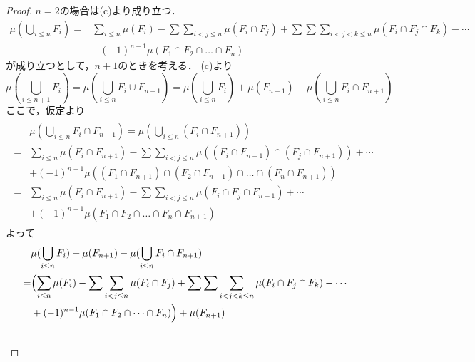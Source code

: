 \documentclass{jsarticle}
\begin{document}
\begin{description}
        \begin{proof}
            $n=2$の場合は(c)より成り立つ．
            \begin{equation}
                \begin{split}
                    \mu(\bigcup_{i\leq n}F_i) = &\sum_{i\leq n}\mu(F_i) -  \sum\sum_{i<j\leq n}\mu(F_i\cap F_j) + \sum\sum\sum_{i<j<k\leq n}\mu(F_i\cap F_j\cap F_k) - \cdots
                    \\ &+ (-1)^{n-1}\mu(F_1\cap F_2\cap\dots\cap F_n) \nonumber
                \end{split}
            \end{equation}
            が成り立つとして，$n+1$のときを考える．
            (c)より
            \begin{equation}
                \mu(\bigcup_{i\leq n+1}F_i)=\mu(\bigcup_{i\leq n}F_i\cup F_{n+1})=\mu(\bigcup_{i\leq n}F_i)+\mu(F_{n+1})-\mu(\bigcup_{i\leq n}F_i\cap F_{n+1}) \nonumber
            \end{equation}
            ここで，仮定より
            \begin{align}
                \begin{split}
                    &\mu(\bigcup_{i\leq n}F_i\cap F_{n+1})=\mu(\bigcup_{i\leq n}(F_i\cap F_{n+1})) \\ \nonumber
                    = &\sum_{i\leq n}\mu(F_i\cap F_{n+1}) -  \sum\sum_{i<j\leq n}\mu((F_i\cap F_{n+1})\cap (F_j\cap F_{n+1})) + \cdots
                    \\ &+ (-1)^{n-1}\mu((F_1\cap F_{n+1})\cap (F_2\cap F_{n+1})\cap\dots\cap (F_n\cap F_{n+1})) \\ \nonumber
                    = &\sum_{i\leq n}\mu(F_i\cap F_{n+1}) -  \sum\sum_{i<j\leq n}\mu(F_i\cap F_j\cap F_{n+1}) + \cdots \\ &+ (-1)^{n-1}\mu(F_1\cap F_2\cap\dots\cap F_n\cap F_{n+1}) \nonumber
                \end{split}
            \end{align}
            よって
            \begin{align}
                \begin{split}
                    &\mu(\bigcup_{i\leq n}F_i)+\mu(F_{n+1})-\mu(\bigcup_{i\leq n}F_i\cap F_{n+1}) \\ \nonumber
                    = & \Bigl( \sum_{i\leq n}\mu(F_i) -  \sum\sum_{i<j\leq n}\mu(F_i\cap F_j) + \sum\sum\sum_{i<j<k\leq n}\mu(F_i\cap F_j\cap F_k) - \cdots 
                    \\ & + (-1)^{n-1}\mu(F_1\cap F_2\cap\dots\cap F_n) \Bigr) +\mu(F_{n+1}) \\ \nonumber

\end{split}
\end{align}
\end{proof}
\end{description}
\end{document}

